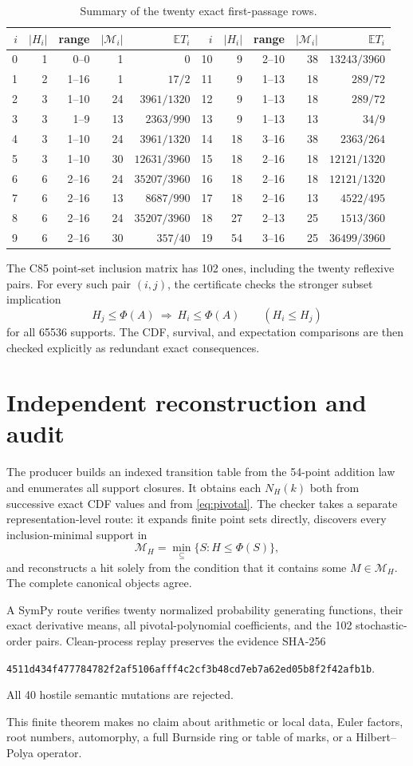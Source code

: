 \documentclass[10pt]{article}
\newcommand{\Phiop}{\Phi}
\newcommand{\E}{\mathbb E}
\begin{document}
\begin{table}[ht]
\centering
\small
\begin{tabular}{rrrrr@{\qquad}rrrrr}
\toprule
$i$&$|H_i|$&range&$|\mathcal M_i|$&$\E T_i$&
$i$&$|H_i|$&range&$|\mathcal M_i|$&$\E T_i$\\
\midrule
0&1&0--0&1&$0$&10&9&2--10&38&$13243/3960$\\
1&2&1--16&1&$17/2$&11&9&1--13&18&$289/72$\\
2&3&1--10&24&$3961/1320$&12&9&1--13&18&$289/72$\\
3&3&1--9&13&$2363/990$&13&9&1--13&13&$34/9$\\
4&3&1--10&24&$3961/1320$&14&18&3--16&38&$2363/264$\\
5&3&1--10&30&$12631/3960$&15&18&2--16&18&$12121/1320$\\
6&6&2--16&24&$35207/3960$&16&18&2--16&18&$12121/1320$\\
7&6&2--16&13&$8687/990$&17&18&2--16&13&$4522/495$\\
8&6&2--16&24&$35207/3960$&18&27&2--13&25&$1513/360$\\
9&6&2--16&30&$357/40$&19&54&3--16&25&$36499/3960$\\
\bottomrule
\end{tabular}
\caption{Summary of the twenty exact first-passage rows.}
\label{tab:atlas}
\end{table}

The C85 point-set inclusion matrix has 102 ones, including the twenty
reflexive pairs.  For every such pair $(i,j)$, the certificate checks the
stronger subset implication
\[
 H_j\leq\Phiop(A)\ \Longrightarrow\ H_i\leq\Phiop(A)
 \qquad(H_i\leq H_j)
\]
for all 65536 supports.  The CDF, survival, and expectation comparisons are
then checked explicitly as redundant exact consequences.

\section{Independent reconstruction and audit}
The producer builds an indexed transition table from the 54-point addition
law and enumerates all support closures.  It obtains each $N_H(k)$ both from
successive exact CDF values and from \eqref{eq:pivotal}.  The checker takes a
separate representation-level route: it expands finite point sets directly,
discovers every inclusion-minimal support in
\[
 \mathcal M_H=\min_{\subseteq}\{S:H\leq\Phiop(S)\},
\]
and reconstructs a hit solely from the condition that it contains some
$M\in\mathcal M_H$.  The complete canonical objects agree.

A SymPy route verifies twenty normalized probability generating functions,
their exact derivative means, all pivotal-polynomial coefficients, and the
102 stochastic-order pairs.  Clean-process replay preserves the evidence
SHA-256
\begin{center}
\texttt{4511d434f477784782f2af5106afff4c2cf3b48cd7eb7a62ed05b8f2f42afb1b}.
\end{center}
All 40 hostile semantic mutations are rejected.

This finite theorem makes no claim about arithmetic or local data, Euler
factors, root numbers, automorphy, a full Burnside ring or table of marks, or
a Hilbert--Polya operator.
\end{document}
